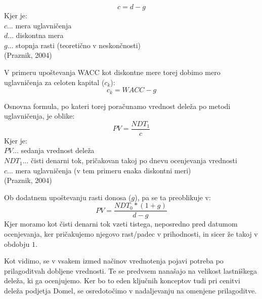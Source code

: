 \documentclass[12pt,a4paper]{amsart}
\theoremstyle{definition} %
\theoremstyle{plain} %
\begin{document}
\begin{equation}
c=d-g
\end{equation}
Kjer je:\\
$c$... mera uglavničenja\\
$d$... diskontna mera\\
$g$... stopnja rasti (teoretično v neskončnosti)\\
(Praznik, 2004)\par

V primeru upoštevanja WACC kot diskontne mere torej dobimo mero uglavničenja za celoten kapital ($c_k$):
\begin{equation}
c_k=WACC-g
\end{equation}

Osnovna formula, po kateri torej poračunamo vrednost deleža po metodi uglavničenja, je oblike:
\begin{equation}
PV=\frac{NDT_1}{c}
\end{equation}
Kjer je:\\
$PV$... sedanja vrednost deleža\\
$NDT_1$... čisti denarni tok, pričakovan takoj po dnevu ocenjevanja vrednosti\\
$c$... mera uglavničenja (v tem primeru enaka diskontni meri)\\
(Praznik, 2004)\par

Ob dodatnem upoštevanju rasti donosa ($g$), pa se ta preoblikuje v:
\begin{equation}
PV=\frac{NDT_0*(1+g)}{d-g}
\end{equation}
Kjer moramo kot čisti denarni tok vzeti tistega, neposredno pred datumom ocenjevanja, ker pričakujemo njegovo rast/padec v prihodnosti, in sicer že takoj v obdobju $1$.\par

Kot vidimo, se v vsakem izmed načinov vrednotenja pojavi potreba po prilagoditvah dobljene vrednosti. Te se predvsem nanašajo na velikost lastniškega deleža, ki ga ocenjujemo. Ker bo to eden ključnih konceptov tudi pri cenitvi deleža podjetja Domel, se osredotočimo v nadaljevanju na omenjene prilagoditve.
\end{document}
